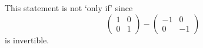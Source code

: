 \begin{exercises}
\begin{answer}
      This statement is not `only if' since
      \begin{equation*}
         \begin{pmatrix}
            1  &0  \\
            0  &1
         \end{pmatrix}
         -\begin{pmatrix}
            -1  &0  \\
            0  &-1
         \end{pmatrix}
      \end{equation*}
      is invertible.  
     \end{answer}
\end{exercises}
